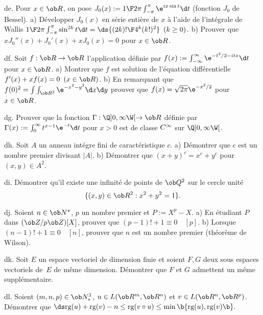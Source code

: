 \exo [Level=2,Fight=2,Learn=2,Type=\Exercices,Field=\SériesEntières, Origin=] de. 
Pour $x\in\ob R$, on pose $J_0(x):={1\F2\pi}\int_{-\pi}^\pi\e^{ix\sin t}\d t$ (fonction $J_0$ de Bessel). \pn
a) Développer $J_0(x)$ en série entière de $x$ à l'aide 
de l'intégrale de Wallis ${1\F2\pi}\int_{-\pi}^\pi\sin^{2k}t\d t=\ds{(2k)!\F4^k(k!)^2}\ \,(k\ge0)$. \pn
b) Prouver que $xJ_0''(x)+J_0'(x)+xJ_0(x)=0$ pour $x\in\ob R$. 


\exo [Level=2,Fight=2,Learn=2,Field=\FonctionsDéfiniesParUneIntégrale,Type=\Exercices,Origin=] df. 
Soit $f:\ob R\to\ob R$ 
l'application définie par $f(x):=\int_{-\infty}^\infty\e^{-t^2/2-itx}\d t$ pour $x\in\ob R$. \pn
a) Montrer que $f$ est solution de l'équation différentielle $f'(x)+xf(x)=0\ \,(x\in\ob R)$. \pn
b) En remarquant que $f(0)^2=\int\int_{\ob R^2}\e^{-x^2-y^2}\d x\d y$ 
prouver que $f(x)=\sqrt{2\pi}\e^{-x^2/2}$ pour $x\in\ob R$. 

\exo [Level=2,Fight=1,Learn=1,Type=\Exercices,Field=\FonctionsDéfiniesParUneIntégrale, Origin=] dg. 
Prouver que la fonction $\Gamma:\Q]0,\infty\W[\to\ob R$ 
définie par $\Gamma(x):=\int_0^\infty t^{x-1}\e^{-t}\d t$ pour $x>0$ 
est de classe $\sc C^\infty$ sur $\Q]0,\infty\W[$. 

\exo [Level=1,Fight=3,Learn=2,Type=\Others,Field=\Anneaux,Origin=\MP] dh. 
Soit $A$ un anneau intégre fini de caractéristique $c$. \pn
a) Démontrer que $c$ est un nombre premier divisant $|A|$. \pn
b) Démontrer que $(x+y)^c=x^c+y^c$ pour $(x,y)\in A^2$.  

\exo [Level=1,Fight=3,Learn=1,Type=\Others,Field=\Trigonométrie,Origin=\Capaces] di. 
Démontrer qu'il existe une infinité de points de $\ob Q^2$ 
sur le cercle unité 
$$
\{(x,y)\in\ob R^2: x^2+y^2=1\}.
$$ 

\exo [Level=1,Fight=3,Learn=2,Type=\Others,Field=\Anneaux,Origin=\MP] dj. 
Soient $n\in\ob N^*$, $p$ un nombre premier et $P:=X^p-X$. \pn
a) En étudiant $P$ dans $(\ob Z/p\ob Z)[X]$, prouver que $(p-1)!+1\equiv0\quad[p]$. \pn
b) Lorsque $(n-1)!+1\equiv0\quad[n]$, prouver que $n$ est un nombre premier (théorème de Wilson). 

\exo [Level=1,Fight=2,Learn=1,Type=\Colles,Field=\EspacesVectoriels,Origin=] dk. 
Soit $E$ un espace vectoriel de dimension finie et soient $F,G$ 
deux sous espaces vectoriels de~$E$ de même dimension. Démontrer que $F$ et $G$ 
admettent un même supplémentaire. 

\exo [Level=1,Fight=2,Learn=2,Type=\Colles,Field=\EspacesVectoriels,Origin=] dl. 
Soient $(m,n,p)\in\ob N_*^3$, $u\in\sc L(\ob R^m,\ob R^n)$ et $v\in\sc L(\ob R^n,\ob R^p)$. 
Démontrer que 
\smallskip
\hfill
$\ds
\hbox{\rm rg}(u)+\hbox{\rm rg}(v)-n\le\hbox{\rm rg}(v\circ u)\le\min\b\{\hbox{\rm rg}(u),\hbox{\rm rg}(v)\b\}.
$\hfill\null
\PAR

